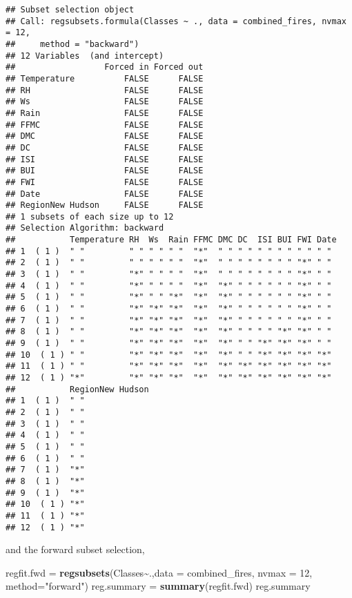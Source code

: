\documentclass[
]{article}
\newenvironment{Shaded}{\begin{snugshade}}{\end{snugshade}}
\newcommand{\AttributeTok}[1]{\textcolor[rgb]{0.13,0.29,0.53}{#1}}
\newcommand{\DecValTok}[1]{\textcolor[rgb]{0.00,0.00,0.81}{#1}}
\newcommand{\FunctionTok}[1]{\textcolor[rgb]{0.13,0.29,0.53}{\textbf{#1}}}
\newcommand{\NormalTok}[1]{#1}
\newcommand{\OtherTok}[1]{\textcolor[rgb]{0.56,0.35,0.01}{#1}}
\newcommand{\SpecialCharTok}[1]{\textcolor[rgb]{0.81,0.36,0.00}{\textbf{#1}}}
\newcommand{\StringTok}[1]{\textcolor[rgb]{0.31,0.60,0.02}{#1}}
\begin{document}
\begin{verbatim}
## Subset selection object
## Call: regsubsets.formula(Classes ~ ., data = combined_fires, nvmax = 12, 
##     method = "backward")
## 12 Variables  (and intercept)
##                  Forced in Forced out
## Temperature          FALSE      FALSE
## RH                   FALSE      FALSE
## Ws                   FALSE      FALSE
## Rain                 FALSE      FALSE
## FFMC                 FALSE      FALSE
## DMC                  FALSE      FALSE
## DC                   FALSE      FALSE
## ISI                  FALSE      FALSE
## BUI                  FALSE      FALSE
## FWI                  FALSE      FALSE
## Date                 FALSE      FALSE
## RegionNew Hudson     FALSE      FALSE
## 1 subsets of each size up to 12
## Selection Algorithm: backward
##           Temperature RH  Ws  Rain FFMC DMC DC  ISI BUI FWI Date
## 1  ( 1 )  " "         " " " " " "  "*"  " " " " " " " " " " " " 
## 2  ( 1 )  " "         " " " " " "  "*"  " " " " " " " " "*" " " 
## 3  ( 1 )  " "         "*" " " " "  "*"  " " " " " " " " "*" " " 
## 4  ( 1 )  " "         "*" " " " "  "*"  "*" " " " " " " "*" " " 
## 5  ( 1 )  " "         "*" " " "*"  "*"  "*" " " " " " " "*" " " 
## 6  ( 1 )  " "         "*" "*" "*"  "*"  "*" " " " " " " "*" " " 
## 7  ( 1 )  " "         "*" "*" "*"  "*"  "*" " " " " " " "*" " " 
## 8  ( 1 )  " "         "*" "*" "*"  "*"  "*" " " " " "*" "*" " " 
## 9  ( 1 )  " "         "*" "*" "*"  "*"  "*" " " "*" "*" "*" " " 
## 10  ( 1 ) " "         "*" "*" "*"  "*"  "*" " " "*" "*" "*" "*" 
## 11  ( 1 ) " "         "*" "*" "*"  "*"  "*" "*" "*" "*" "*" "*" 
## 12  ( 1 ) "*"         "*" "*" "*"  "*"  "*" "*" "*" "*" "*" "*" 
##           RegionNew Hudson
## 1  ( 1 )  " "             
## 2  ( 1 )  " "             
## 3  ( 1 )  " "             
## 4  ( 1 )  " "             
## 5  ( 1 )  " "             
## 6  ( 1 )  " "             
## 7  ( 1 )  "*"             
## 8  ( 1 )  "*"             
## 9  ( 1 )  "*"             
## 10  ( 1 ) "*"             
## 11  ( 1 ) "*"             
## 12  ( 1 ) "*"
\end{verbatim}

and the forward subset selection,

\begin{Shaded}
\begin{Highlighting}[]
\NormalTok{regfit.fwd }\OtherTok{=} \FunctionTok{regsubsets}\NormalTok{(Classes}\SpecialCharTok{\textasciitilde{}}\NormalTok{.,}\AttributeTok{data =}\NormalTok{ combined\_fires, }\AttributeTok{nvmax =} \DecValTok{12}\NormalTok{, }\AttributeTok{method=}\StringTok{"forward"}\NormalTok{)}
\NormalTok{reg.summary }\OtherTok{=} \FunctionTok{summary}\NormalTok{(regfit.fwd)}
\NormalTok{reg.summary}
\end{Highlighting}
\end{Shaded}
\end{document}
